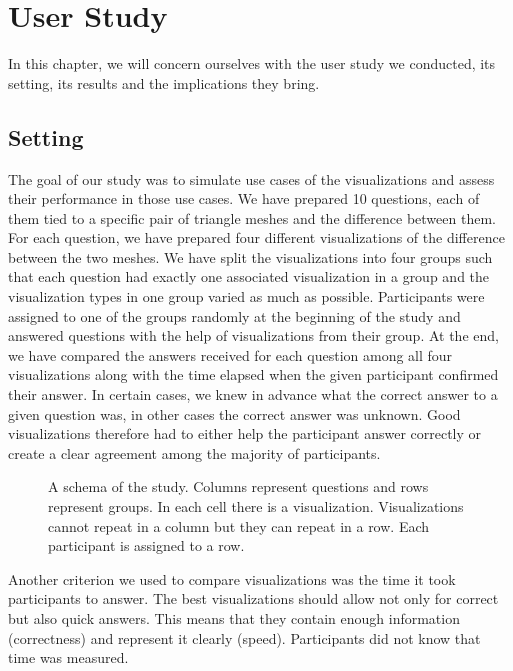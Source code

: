 \chapter{User Study}

In this chapter, we will concern ourselves with the user study we conducted, its setting, its results and the implications they bring.

\section{Setting}
\label{sec:user_study-setting}

The goal of our study was to simulate use cases of the visualizations and assess their performance in those use cases. We have prepared 10 questions, each of them tied to a specific pair of triangle meshes and the difference between them. For each question, we have prepared four different visualizations of the difference between the two meshes. We have split the visualizations into four groups such that each question had exactly one associated visualization in a group and the visualization types in one group varied as much as possible. Participants were assigned to one of the groups randomly at the beginning of the study and answered questions with the help of visualizations from their group. At the end, we have compared the answers received for each question among all four visualizations along with the time elapsed when the given participant confirmed their answer. In certain cases, we knew in advance what the correct answer to a given question was, in other cases the correct answer was unknown. Good visualizations therefore had to either help the participant answer correctly or create a clear agreement among the majority of participants.

\begin{figure}[h]
	\centering
	\def\svgwidth{\textwidth}
	
	\caption[Study Setting]{A schema of the study. Columns represent questions and rows represent groups. In each cell there is a visualization. Visualizations cannot repeat in a column but they can repeat in a row. Each participant is assigned to a row.}
	\label{fig:study_setting}
\end{figure}

Another criterion we used to compare visualizations was the time it took participants to answer. The best visualizations should allow not only for correct but also quick answers. This means that they contain enough information (correctness) and represent it clearly (speed). Participants did not know that time was measured.

